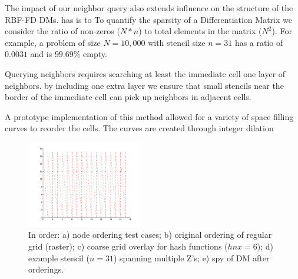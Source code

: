 \documentclass{report}
\begin{document}
The impact of our neighbor query also extends influence on the structure of the RBF-FD DMs.
has is to To quantify the sparsity of a Differentiation Matrix we consider the ratio of non-zeros ($N*n$) to total elements in the matrix ($N^2$). For example, a problem of size $N = 10,000$ with stencil size $n=31$ has a ratio of $0.0031$ and is $99.69\%$ empty. 

Querying neighbors requires searching at least the immediate cell one layer of neighbors. by including one extra layer we ensure that small stencils near the border of the immediate cell can pick up neighbors in adjacent cells.



A prototype implementation of this method allowed for a variety of space filling curves to reorder the cells. The curves are created through integer dilation \cite{IntegerD} 


\begin{figure}
\centering
\includegraphics[width=0.45\textwidth]{rbffd_methods_content/hashing/originalorder_regulargrid-eps-converted-to.pdf}
\caption{In order: a) node ordering test cases; b) original ordering of regular grid (raster); c) coarse grid overlay for hash functions ($hnx = 6$); d) example stencil ($n=31$) spanning multiple Z's; e) spy of DM after orderings. }
\label{fig:orderings}
\end{figure}
\end{document}
